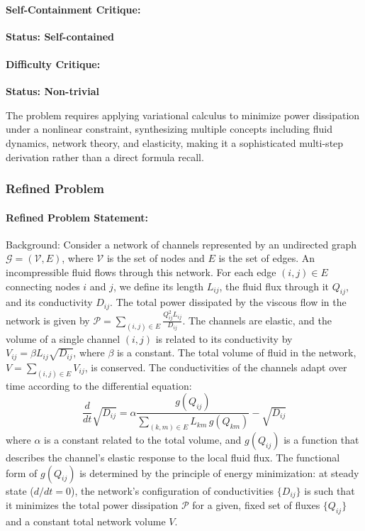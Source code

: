 \documentclass[10pt]{article}
\begin{document}
\paragraph*{Self-Containment Critique:}
\textcolor{pass}{\textbf{Status: Self-contained}}




\paragraph*{Difficulty Critique:}
\textcolor{pass}{\textbf{Status: Non-trivial}}

The problem requires applying variational calculus to minimize power dissipation under a nonlinear constraint, synthesizing multiple concepts including fluid dynamics, network theory, and elasticity, making it a sophisticated multi-step derivation rather than a direct formula recall.


\subsubsection*{Refined Problem}
\paragraph*{Refined Problem Statement:}
Background:
Consider a network of channels represented by an undirected graph $\mathcal{G} = (\mathcal{V}, E)$, where $\mathcal{V}$ is the set of nodes and $E$ is the set of edges. An incompressible fluid flows through this network. For each edge $(i,j) \in E$ connecting nodes $i$ and $j$, we define its length $L_{ij}$, the fluid flux through it $Q_{ij}$, and its conductivity $D_{ij}$. The total power dissipated by the viscous flow in the network is given by $\mathcal{P} = \sum_{(i,j)\in E} \frac{Q_{ij}^2 L_{ij}}{D_{ij}}$. The channels are elastic, and the volume of a single channel $(i,j)$ is related to its conductivity by $V_{ij} = \beta L_{ij} \sqrt{D_{ij}}$, where $\beta$ is a constant. The total volume of fluid in the network, $V = \sum_{(i,j)\in E} V_{ij}$, is conserved. The conductivities of the channels adapt over time according to the differential equation:
$$
\frac{d}{dt}\sqrt{D_{ij}} = \alpha \frac{g(Q_{ij})}{\sum_{(k,m)\in E} L_{km}\, g(Q_{km})} - \sqrt{D_{ij}}
$$
where $\alpha$ is a constant related to the total volume, and $g(Q_{ij})$ is a function that describes the channel's elastic response to the local fluid flux. The functional form of $g(Q_{ij})$ is determined by the principle of energy minimization: at steady state ($d/dt = 0$), the network's configuration of conductivities $\{D_{ij}\}$ is such that it minimizes the total power dissipation $\mathcal{P}$ for a given, fixed set of fluxes $\{Q_{ij}\}$ and a constant total network volume $V$.
\end{document}
